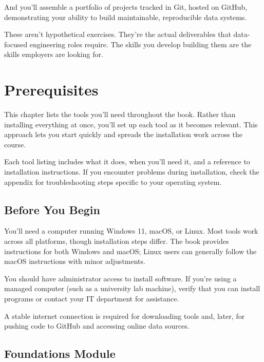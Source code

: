 \documentclass[
  letterpaper,
  DIV=11,
  numbers=noendperiod]{scrreprt}
\begin{document}
And you'll assemble a portfolio of projects tracked in Git, hosted on
GitHub, demonstrating your ability to build maintainable, reproducible
data systems.

These aren't hypothetical exercises. They're the actual deliverables
that data-focused engineering roles require. The skills you develop
building them are the skills employers are looking for.


\chapter*{Prerequisites}\label{prerequisites}


This chapter lists the tools you'll need throughout the book. Rather
than installing everything at once, you'll set up each tool as it
becomes relevant. This approach lets you start quickly and spreads the
installation work across the course.

Each tool listing includes what it does, when you'll need it, and a
reference to installation instructions. If you encounter problems during
installation, check the appendix for troubleshooting steps specific to
your operating system.

\section*{Before You Begin}\label{before-you-begin}


You'll need a computer running Windows 11, macOS, or Linux. Most tools
work across all platforms, though installation steps differ. The book
provides instructions for both Windows and macOS; Linux users can
generally follow the macOS instructions with minor adjustments.

You should have administrator access to install software. If you're
using a managed computer (such as a university lab machine), verify that
you can install programs or contact your IT department for assistance.

A stable internet connection is required for downloading tools and,
later, for pushing code to GitHub and accessing online data sources.

\section*{Foundations Module}\label{foundations-module}
\end{document}
